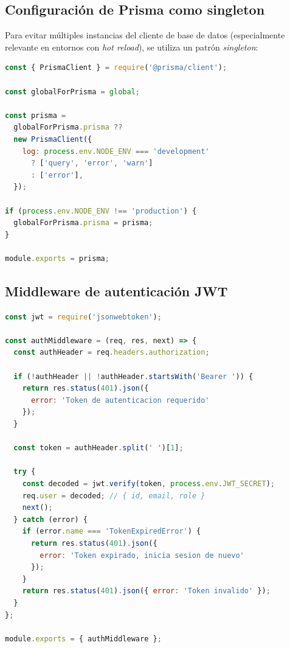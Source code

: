 \documentclass[a4paper]{report}
\begin{document}
\subsection{Configuración de Prisma como singleton}

Para evitar múltiples instancias del cliente de base de datos (especialmente relevante en entornos con \textit{hot reload}), se utiliza un patrón \textit{singleton}:

\begin{lstlisting}[language=JavaScript,
  caption={src/config/prisma.js -- Instancia única del cliente Prisma}]
const { PrismaClient } = require('@prisma/client');

const globalForPrisma = global;

const prisma =
  globalForPrisma.prisma ??
  new PrismaClient({
    log: process.env.NODE_ENV === 'development'
      ? ['query', 'error', 'warn']
      : ['error'],
  });

if (process.env.NODE_ENV !== 'production') {
  globalForPrisma.prisma = prisma;
}

module.exports = prisma;
\end{lstlisting}

\subsection{Middleware de autenticación JWT}

\begin{lstlisting}[language=JavaScript,
  caption={src/middlewares/auth.js -- Verificación de JWT}]
const jwt = require('jsonwebtoken');

const authMiddleware = (req, res, next) => {
  const authHeader = req.headers.authorization;

  if (!authHeader || !authHeader.startsWith('Bearer ')) {
    return res.status(401).json({
      error: 'Token de autenticacion requerido'
    });
  }

  const token = authHeader.split(' ')[1];

  try {
    const decoded = jwt.verify(token, process.env.JWT_SECRET);
    req.user = decoded; // { id, email, role }
    next();
  } catch (error) {
    if (error.name === 'TokenExpiredError') {
      return res.status(401).json({
        error: 'Token expirado, inicia sesion de nuevo'
      });
    }
    return res.status(401).json({ error: 'Token invalido' });
  }
};

module.exports = { authMiddleware };
\end{lstlisting}
\end{document}
